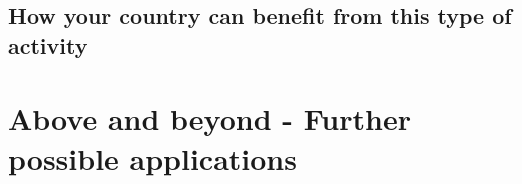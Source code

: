 \documentclass[
]{article}
\begin{document}
\hypertarget{how-your-country-can-benefit-from-this-type-of-activity-1}{%
\subsection{How your country can benefit from this type of activity}\label{how-your-country-can-benefit-from-this-type-of-activity-1}}

\hypertarget{above-and-beyond---further-possible-applications}{%
\section{Above and beyond - Further possible applications}\label{above-and-beyond---further-possible-applications}}
\end{document}
